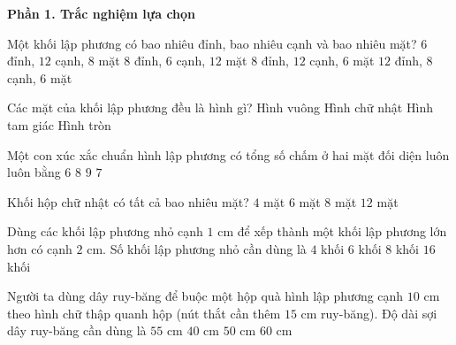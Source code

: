 \textbf{Phần 1. Trắc nghiệm lựa chọn}

\begin{ex} %
Một khối lập phương có bao nhiêu đỉnh, bao nhiêu cạnh và bao nhiêu mặt?
\choice
{$6$ đỉnh, $12$ cạnh, $8$ mặt}
{$8$ đỉnh, $6$ cạnh, $12$ mặt}
{\True $8$ đỉnh, $12$ cạnh, $6$ mặt}
{$12$ đỉnh, $8$ cạnh, $6$ mặt}
\end{ex}

\begin{ex} %
Các mặt của khối lập phương đều là hình gì?
\choice
{\True Hình vuông}
{Hình chữ nhật}
{Hình tam giác}
{Hình tròn}
\end{ex}

\begin{ex} %
Một con xúc xắc chuẩn hình lập phương có tổng số chấm ở hai mặt đối diện luôn luôn bằng
\choice
{$6$}
{$8$}
{$9$}
{\True $7$}
\end{ex}

\begin{ex} %
Khối hộp chữ nhật có tất cả bao nhiêu mặt?
\choice
{$4$ mặt}
{\True $6$ mặt}
{$8$ mặt}
{$12$ mặt}
\end{ex}

\begin{ex} %
Dùng các khối lập phương nhỏ cạnh $1\text{ cm}$ để xếp thành một khối lập phương lớn hơn có cạnh $2\text{ cm}$. Số khối lập phương nhỏ cần dùng là
\choice
{$4$ khối}
{$6$ khối}
{\True $8$ khối}
{$16$ khối}
\end{ex}

\begin{ex} %
Người ta dùng dây ruy-băng để buộc một hộp quà hình lập phương cạnh $10\text{ cm}$ theo hình chữ thập quanh hộp (nút thắt cần thêm $15\text{ cm}$ ruy-băng). Độ dài sợi dây ruy-băng cần dùng là
\choice
{\True $55\text{ cm}$}
{$40\text{ cm}$}
{$50\text{ cm}$}
{$60\text{ cm}$}
\end{ex}

